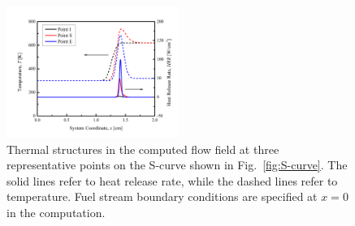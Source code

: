 \documentclass[review,3p,times]{elsarticle}
\begin{document}
\begin{figure}[t]
  \centering
  \scriptsize
  \includegraphics[trim=6.5mm 7.5mm 7mm 8mm, clip=true, width=0.5\textwidth]{HRR.png}
  \normalsize
  \caption{Thermal structures in the computed flow field at three representative points on the S-curve shown in Fig.~\ref{fig:S-curve}.  \textcolor{Rev1}{The solid lines refer to heat release rate, while the dashed lines refer to temperature.}  Fuel stream boundary conditions are specified at $x=0$ in the computation.}
  \label{fig:HRR}
\end{figure}
\end{document}
